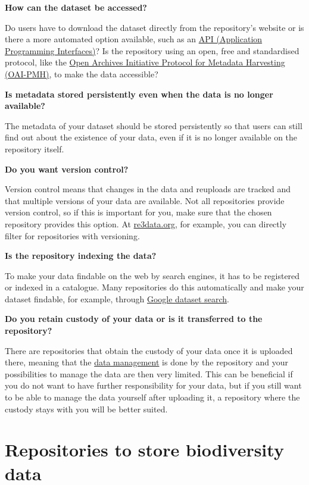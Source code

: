 \documentclass[
]{book}
\begin{document}
\textbf{How can the dataset be accessed?}

Do users have to download the dataset directly from the repository's website or is there a more automated option available, such as an \protect\hyperlink{API}{API (Application Programming Interfaces)}? Is the repository using an open, free and standardised protocol, like the \href{https://www.openarchives.org/pmh/}{Open Archives Initiative Protocol for Metadata Harvesting (OAI-PMH)}, to make the data accessible?

\textbf{Is metadata stored persistently even when the data is no longer available?}

The metadata of your dataset should be stored persistently so that users can still find out about the existence of your data, even if it is no longer available on the repository itself.

\textbf{Do you want version control?}

Version control means that changes in the data and reuploads are tracked and that multiple versions of your data are available. Not all repositories provide version control, so if this is important for you, make sure that the chosen repository provides this option. At \href{http://re3data.org}{re3data.org}, for example, you can directly filter for repositories with versioning.

\textbf{Is the repository indexing the data?}

To make your data findable on the web by search engines, it has to be registered or indexed in a catalogue. Many repositories do this automatically and make your dataset findable, for example, through \href{https://datasetsearch.research.google.com/}{Google dataset search}.

\textbf{Do you retain custody of your data or is it transferred to the repository?}

There are repositories that obtain the custody of your data once it is uploaded there, meaning that the \protect\hyperlink{datamanagement}{data management} is done by the repository and your possibilities to manage the data are then very limited. This can be beneficial if you do not want to have further responsibility for your data, but if you still want to be able to manage the data yourself after uploading it, a repository where the custody stays with you will be better suited.

\hypertarget{repositories-to-store-biodiversity-data}{%
\section{Repositories to store biodiversity data}\label{repositories-to-store-biodiversity-data}}
\end{document}
